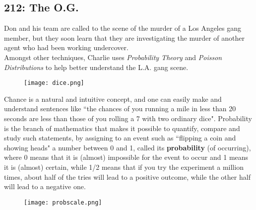 \newpage
\subsection{212: The O.G.}\label{212}

Don and his team are called to the scene of the murder of a Los Angeles gang member, but they soon learn that they are investigating the murder of another agent who had been working undercover. \\

Amongst other techniques, Charlie uses \emph{Probability Theory} and \emph{Poisson Distributions} to help better understand the L.A. gang scene. \\

\begin{figure}[H]
   \centering
   \texttt{[image: dice.png]} 
\end{figure}


Chance is a natural and intuitive concept, and one can easily make and understand sentences like ``the chances of you running a mile in less than 20 seconds are less than those of you rolling a 7 with two ordinary dice". Probability is the branch of mathematics that makes it possible to quantify, compare and study such statements, by assigning to an event such as ``flipping a coin and showing heads" a number between 0 and 1, called its \textbf{probability} (of occurring), where 0 means that it is (almost) impossible for the event to occur and 1 means it is (almost) certain, while 1/2 means that if you try the experiment a million times, about half of the tries will lead to a positive outcome, while the other half will lead to a negative one.

\begin{figure}[H]
   \centering
   \texttt{[image: probscale.png]} 
\end{figure}

 \vspace{0.2cm}

